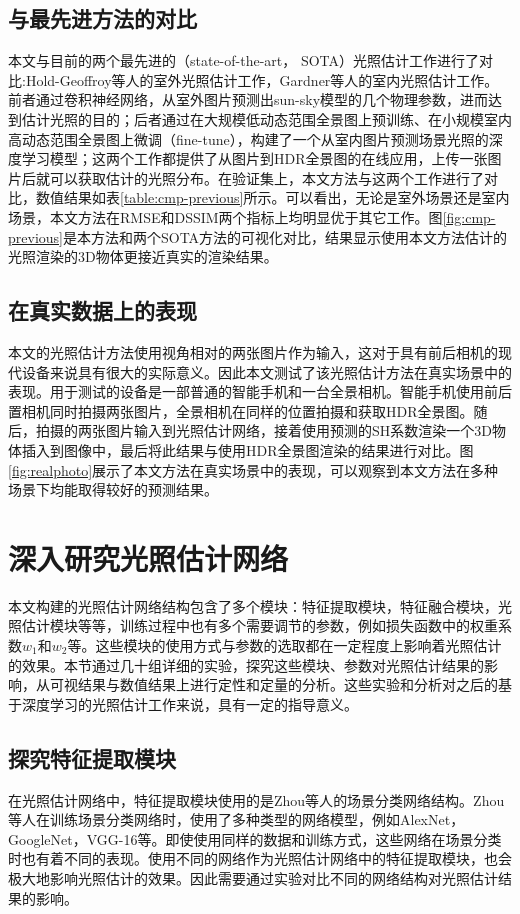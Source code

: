 \subsection{与最先进方法的对比}

本文与目前的两个最先进的（state-of-the-art， SOTA）光照估计工作进行了对比:Hold-Geoffroy等人\cite{hold2017deep}的室外光照估计工作，Gardner等人\cite{gardner2017learning}的室内光照估计工作。前者通过卷积神经网络，从室外图片预测出sun-sky模型\cite{hovsekhovsek2013adding}的几个物理参数，进而达到估计光照的目的；后者通过在大规模低动态范围全景图上预训练、在小规模室内高动态范围全景图上微调（fine-tune），构建了一个从室内图片预测场景光照的深度学习模型；这两个工作都提供了从图片到HDR全景图的在线应用，上传一张图片后就可以获取估计的光照分布。在验证集上，本文方法与这两个工作进行了对比，数值结果如表\ref{table:cmp-previous}所示。可以看出，无论是室外场景还是室内场景，本文方法在RMSE和DSSIM两个指标上均明显优于其它工作。图\ref{fig:cmp-previous}是本方法和两个SOTA方法的可视化对比，结果显示使用本文方法估计的光照渲染的3D物体更接近真实的渲染结果。


\subsection{在真实数据上的表现}
本文的光照估计方法使用视角相对的两张图片作为输入，这对于具有前后相机的现代设备来说具有很大的实际意义。因此本文测试了该光照估计方法在真实场景中的表现。用于测试的设备是一部普通的智能手机和一台全景相机。智能手机使用前后置相机同时拍摄两张图片，全景相机在同样的位置拍摄和获取HDR全景图。随后，拍摄的两张图片输入到光照估计网络，接着使用预测的SH系数渲染一个3D物体插入到图像中，最后将此结果与使用HDR全景图渲染的结果进行对比。图\ref{fig:realphoto}展示了本文方法在真实场景中的表现，可以观察到本文方法在多种场景下均能取得较好的预测结果。

\section{深入研究光照估计网络}\label{sec:ablation-study}
本文构建的光照估计网络结构包含了多个模块：特征提取模块，特征融合模块，光照估计模块等等，训练过程中也有多个需要调节的参数，例如损失函数中的权重系数$w_1$和$w_2$等。这些模块的使用方式与参数的选取都在一定程度上影响着光照估计的效果。本节通过几十组详细的实验，探究这些模块、参数对光照估计结果的影响，从可视结果与数值结果上进行定性和定量的分析。这些实验和分析对之后的基于深度学习的光照估计工作来说，具有一定的指导意义。

\subsection{探究特征提取模块}
在光照估计网络中，特征提取模块使用的是Zhou等人\cite{zhou2017places}的场景分类网络结构。Zhou等人\cite{zhou2017places}在训练场景分类网络时，使用了多种类型的网络模型，例如AlexNet\cite{krizhevsky2012imagenet}，GoogleNet\cite{szegedy2015going}，VGG-16\cite{simonyan2014very}等。即使使用同样的数据和训练方式，这些网络在场景分类时也有着不同的表现。使用不同的网络作为光照估计网络中的特征提取模块，也会极大地影响光照估计的效果。因此需要通过实验对比不同的网络结构对光照估计结果的影响。

